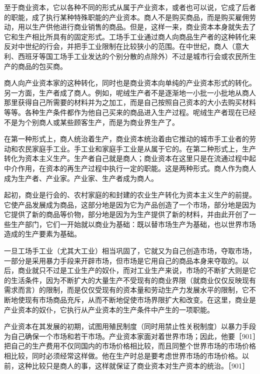 至于商业资本，它以各种不同的形式从属于产业资本，或者也可以说，它成了后者的职能，成了执行某种特殊职能的产业资本。商人不是购买商品，而是购买雇佣劳动，用以生产供他进行商业销售的商品。但是，这样一来，商业资本本身就失去了它和生产相比所具有的固定形式。工场手工业通过商人向商品生产者的这种转化来反对中世纪的行会，并把手工业限制在比较狭小的范围。在中世纪，商人（意大利、西班牙等国工场手工业发达的个别分散的点除外）不过是城市行会或农民所生产的商品的包买商。

商人向产业资本家的这种转化，同时也是商业资本向单纯的产业资本形式的转化。另一方面，生产者成了商人。例如，呢绒生产者不是逐渐地一小批一小批地从商人那里获得自己所需要的材料并为之加工，而是自己按照自己资本的大小去购买材料等等。各种生产条件都作为他自己买来的商品进入生产过程。呢绒生产者现在已经不是为个别商人或某些顾客生产，而是为商业界生产了。

在第一种形式上，商人统治着生产，商业资本统治着由它推动的城市手工业者的劳动和农民家庭手工业。手工业和家庭手工业是从属于它的。在第二种形式上，生产转化为资本主义生产。生产者自己就是商人；商业资本在这里只是在流通过程中起中介作用，在资本的再生产过程中执行一定的职能。这是两种形式。商人作为商人成为生产者、产业家。产业家、生产者成为商人。

起初，商业是行会的、农村家庭的和封建的农业生产转化为资本主义生产的前提。它使产品发展成为商品，这部分地是因为它为产品创造了一个市场，部分地是因为它提供了新的商品等价物，部分地是因为为生产提供了新的材料，并由此开创了一些生产部门，它们一开始就以商业为基础：既以替市场生产为基础，也以世界市场造成的生产要素为基础。

一旦工场手工业（尤其大工业）相当巩固了，它就又为自己创造市场，夺取市场，一部分是采用暴力手段来开辟市场，但市场是它用自己的商品本身来夺取的。以后，商业就只不过是工业生产的奴仆，而对工业生产来说，市场的不断扩大则是它的生活条件，因为不断扩大的大量生产不受现有的商业界限（就商业仅仅反映现有需求而言）的限制，而是仅仅受现有的资本量和劳动生产力发展水平的限制，它不断地使现有市场商品充斥，从而不断地促使市场界限扩大和改变。在这里，商业是产业资本的奴仆，它执行从产业资本的生产条件中产生的一项职能。

产业资本在其发展的初期，试图用殖民制度（同时用禁止性关税制度）以暴力手段为自己确保一个市场和若干市场。产业资本家面对着世界市场；因此，他要［901］把自己的生产费用不仅同国内的市场价格相比较，而且同整个世界市场的市场价格相比较，同时必须经常这样做。他在生产时总是要考虑世界市场的市场价格。以前，这种比较只是商人的事，这样就保证了商业资本对生产资本的统治。［901］

